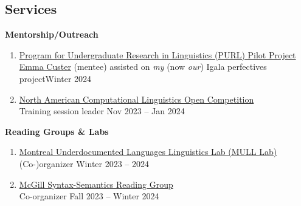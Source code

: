 \documentclass[margin,line]{resume}
\begin{document}
\begin{resume}
	\begin{comment}
	\section{\mysidestyle Teaching}

	\href{https://www.mcgill.ca/study/2023-2024/courses/ling-410}{LING 410 - Structure of Wolof} undergraduate class for \href{https://inamartinovic.com/}{Martina Martinović}.\\
	McGill University.
	\hfill Feb 28 2024

	\vspace{-0.6em}\rule{\textwidth}{0.4pt}
	\end{comment}


	\section{\mysidestyle Services}


	\textbf{Mentorship/Outreach}
	\begin{enumerate}[-, leftmargin=1em, topsep=4pt]
		\item[] \href{https://www.mcgill.ca/cogsci/research/cogs396}{Program for Undergraduate Research in Linguistics (PURL) Pilot Project}\\
		      \hphantom{...}\href{https://www.linkedin.com/in/emma-custer-648345252}{Emma Custer} (mentee) assisted on {\it my} (now {\it our}) Igala perfectives project\hfill Winter 2024

		\item[] \href{https://naclo.org/}{North American Computational Linguistics Open Competition}\\
		      \hphantom{...}Training session leader \hfill Nov 2023 -- Jan 2024
	\end{enumerate}

	\textbf{Reading Groups \& Labs}
	\begin{enumerate}[-, leftmargin=1em, topsep=4pt]
		\item[] \href{https://mcling.blogs.mcgill.ca/category/mull-lab/}{Montreal Underdocumented Languages Linguistics Lab (MULL Lab)}\\
		      \hphantom{...}(Co-)organizer \hfill Winter 2023 -- 2024

		\item[] \href{https://mcling.blogs.mcgill.ca/category/syntax-semantics-group/}{McGill Syntax-Semantics Reading Group}\\
		      \hphantom{...}Co-organizer \hfill Fall 2023 -- Winter 2024
	\end{enumerate}


\end{resume}
\end{document}
